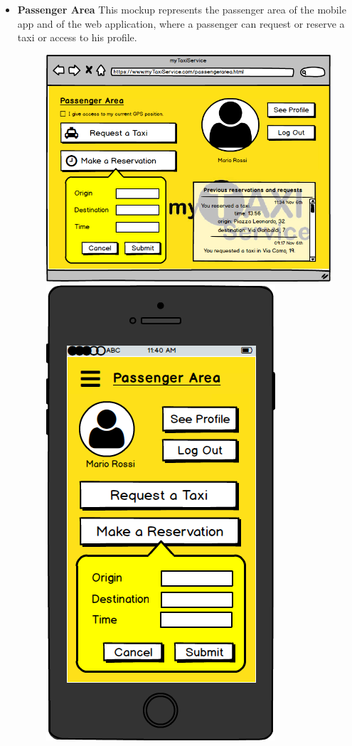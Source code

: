 \documentclass[18pt,oneside,a4paper, titlepage]{article}
\begin{document}
\begin{itemize}
\begin{figure}[h]
				\end{figure}
				\\ 	\\
				\item \textbf{Passenger Area} This mockup represents the passenger area of the mobile app and of the web application, where a passenger can request or reserve a taxi or access to his profile.\\
				\begin{figure}[h]
					\includegraphics[scale=0.3]{Mockups/WebAppMakeAReservation.png}%
					\qquad\qquad
					\includegraphics[scale=0.3]{Mockups/MobileAppMakeAReservation.png}

\end{figure}
\end{itemize}
\end{document}

